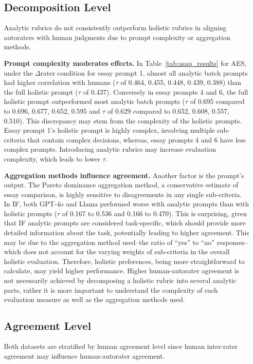 \subsection{Decomposition Level}

Analytic rubrics do not consistently outperform holistic rubrics in aligning autoraters with human judgments due to prompt complexity or aggregation methods. 

\textbf{Prompt complexity moderates effects. }In Table~\ref{tab:asap_results} for AES, under the $\Delta$rater condition for essay prompt 1, almost all analytic batch prompts had higher correlation with humans ($\tau$ of 0.464, 0.455, 0.448, 0.439, 0.388) than the full holistic prompt ($\tau$ of 0.437). Conversely in essay prompts 4 and 6, the full holistic prompt outperformed most analytic batch prompts ($\tau$ of 0.695 compared to 0.696, 0.677, 0.652, 0.595 and $\tau$ of 0.629 compared to 0.652, 0.608, 0.557, 0.510). This discrepancy may stem from the complexity of the holistic prompts. Essay prompt 1's holistic prompt is highly complex, involving multiple sub-criteria that contain complex decisions, whereas, essay prompts 4 and 6 have less complex prompts. Introducing analytic rubrics may increase evaluation complexity, which leads to lower $\tau$. 

\textbf{Aggregation methods influence agreement. }Another factor is the prompt's output. The Pareto dominance aggregation method, a conservative estimate of essay comparison, is highly sensitive to disagreements in any single sub-criteria. In IF, both GPT-4o and Llama performed worse with analytic prompts than with holistic prompts ($\tau$ of 0.167 to 0.536 and 0.166 to 0.470). This is surprising, given that IF analytic prompts are considered task-specific, which should provide more detailed information about the task, potentially leading to higher agreement. This may be due to the aggregation method used--the ratio of ``yes'' to ``no'' responses--which does not account for the varying weights of sub-criteria in the overall holistic evaluation. Therefore, holistic preferences, being more straightforward to calculate, may yield higher performance. Higher human-autorater agreement is not necessarily achieved by decomposing a holistic rubric into several analytic parts, rather it is more important to understand the complexity of each evaluation measure as well as the aggregation methods used.

\subsection{Agreement Level}
Both datasets are stratified by human agreement level since human inter-rater agreement may influence human-autorater agreement.

